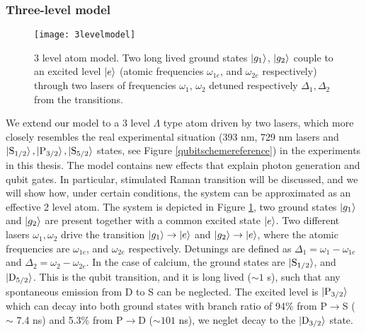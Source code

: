\subsubsection{Three-level model}
\label{sec:threelevel}
\begin{figure}
\centering
\texttt{[image: 3levelmodel]}
\caption{3 level atom model. Two long lived ground states $\ket{g_1}$, $\ket{g_2}$ couple to an excited level $\ket{e}$ (atomic frequencies $\omega_{1e}$, and $\omega_{2e}$ respectively) through two lasers of frequencies $\omega_1$, $\omega_2$ detuned respectively $\Delta_1,\Delta_2$ from the transitions.}
\label{3levelmodel}
\end{figure}
We extend our model to a 3 level $\Lambda$ type atom driven by two lasers, which more closely resembles the real experimental situation (393 nm, 729 nm lasers and $\ket{\text{S}_{1/2}},\ket{\text{P}_{3/2}},\ket{\text{S}_{5/2}}$ states, see Figure \ref{qubitschemereference}) in the experiments in this thesis. The model contains new effects that explain photon generation and qubit gates. In particular, stimulated Raman transition will be discussed, and we will show how, under certain conditions, the system can be approximated as an effective 2 level atom. The system is depicted in Figure \ref{3levelmodel}, two ground states $\ket{g_1}$ and $\ket{g_2}$ are present together with a common excited state $\ket{e}$. Two different lasers $\omega_1,\omega_2$ drive the transition $\ket{g_1} \to \ket{e}$ and $\ket{g_2} \to \ket{e}$, where the atomic frequencies are $\omega_{1e}$, and $\omega_{2e}$ respectively. Detunings are defined as $\Delta_1 = \omega_1 - \omega_{1e}$ and $\Delta_2 = \omega_2 - \omega_{2e}$. In the case of calcium, the ground states are $\ket{\text{S}_{1/2}}$, and $\ket{\text{D}_{5/2}}$. This is the qubit transition, and it is long lived ($\sim 1$ s), such that any spontaneous emission from D to S can be neglected. The excited level is $\ket{\text{P}_{3/2}}$ which can decay into both ground states with branch ratio of 94\% from P$\to$S ($\sim$ 7.4 ns) and 5.3\% from P$\to$D ($\sim 101$ ns), we neglet decay to the $\ket{\text{D}_{3/2}}$ state.\par
